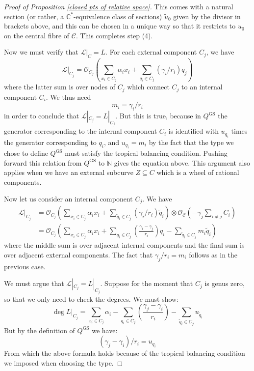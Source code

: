\documentclass[11pt]{amsart}
\newcommand{\N}{\mathbb{N}}
\newcommand{\OO}{\mathcal{O}}
\newcommand{\CC}{\mathbb{C}}
\newcommand{\Ccal}{\mathcal{C}}
\newcommand{\Lcal}{\mathcal{L}}
\theoremstyle{definition}
\theoremstyle{definition}
\begin{document}
\begin{proof}[Proof of Proposition \ref{closed pts of relative space}]
This comes with a natural section (or rather, a $\CC^*$-equivalence class of sections) $\tilde{u}_0$ given by the divisor in brackets above, and this can be chosen in a unique way so that it restricts to $u_0$ on the central fibre of $\Ccal$. This completes step (4).

Now we must verify that $\Lcal|_C=L$. For each external component $C_j$, we have
\begin{equation*} \Lcal|_{C_j} = \OO_{C_j} \left( \sum_{x_i \in C_j} \alpha_i x_i + \sum_{q_i \in C_j} (\gamma_i/r_i) q_j \right) \end{equation*}
where the latter sum is over nodes of $C_j$ which connect $C_j$ to an internal component $C_i$. We thus need
\begin{equation*} m_i = \gamma_i / r_i \end{equation*}
in order to conclude that $\Lcal|_{C_j} = L|_{C_j}$. But this is true, because in $Q^{\operatorname{GS}}$ the generator corresponding to the internal component $C_i$ is identified with $u_{q_i}$ times the generator corresponding to $q_i$, and $u_{q_i}=m_i$ by the fact that the type we chose to define $Q^{\operatorname{GS}}$ must satisfy the tropical balancing condition. Pushing forward this relation from $Q^{\operatorname{GS}}$ to $\N$ gives the equation above. This argument also applies when we have an external subcurve $Z \subseteq C$ which is a wheel of rational components.

Now let us consider an internal component $C_j$. We have
\begin{align*} \Lcal|_{C_j} & = \OO_{C_j} \left( \sum_{x_i \in C_j} \alpha_i x_i + \sum_{\tilde{q}_i \in C_j} (\gamma_i/r_i) \tilde{q}_i \right) \otimes \OO_{\mathcal{C}}\left(- \gamma_j \sum_{i \neq j} C_i \right) \\
& = \OO_{C_j}\left( \sum_{x_i \in C_j} \alpha_i x_i + \sum_{q_i \in C_j} \left(\frac{\gamma_i - \gamma_j}{r_i}\right) q_i - \sum_{\tilde{q}_i \in C_j} m_i \tilde{q}_i \right)\end{align*}
where the middle sum is over adjacent internal components and the final sum is over adjacent external components. The fact that $\gamma_j/r_i = m_i$ follows as in the previous case.

We must argue that $\Lcal|_{C_j} = L|_{C_j}$. Suppose for the moment that $C_j$ is genus zero, so that we only need to check the degrees. We must show:
\begin{equation*} \deg L|_{C_j} = \sum_{x_i \in C_j} \alpha_i - \sum_{q_i \in C_j} \left( \dfrac{\gamma_j - \gamma_i}{r_i}\right) - \sum_{\tilde{q}_i \in C_j} u_{\tilde{q}_i}\end{equation*}
But by the definition of $Q^{\operatorname{GS}}$ we have:
\begin{equation*} (\gamma_j - \gamma_i)/r_i = u_{q_i} \end{equation*}
From which the above formula holds because of the tropical balancing condition we imposed when choosing the type.


\end{proof}
\end{document}
